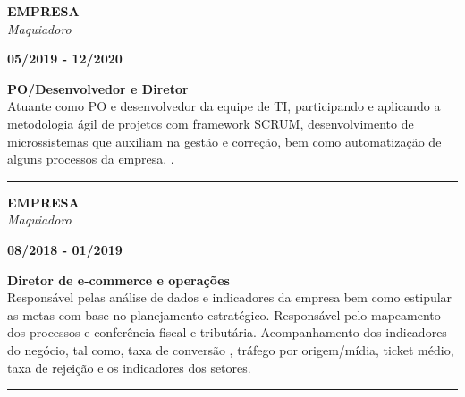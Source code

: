 \documentclass[12pt, a4paper]{article}
\newcommand{\LlinhaM}{1pt} 	 %
\newcommand{\TlinhaM}{17cm}		 %
\begin{document}
\begin{multicols}{2}
	\begin{flushleft}
		\textbf{EMPRESA}\\
		\textit{Maquiadoro}\\
	\end{flushleft}
	\vfill
	\begin{flushright}
		\textbf{05/2019 - 12/2020}\\
	\end{flushright}
\end{multicols}
\begin{flushleft}
	\textbf{PO/Desenvolvedor e Diretor}\\
	Atuante como PO e desenvolvedor da equipe de TI, participando e aplicando a metodologia ágil de projetos com framework SCRUM,
	desenvolvimento de microssistemas que auxiliam na gestão e correção, bem como automatização de alguns processos da empresa.
	.
\end{flushleft}

\begin{center} %
	\rule{\TlinhaM}{\LlinhaM}
\end{center}

\begin{multicols}{2}
	\begin{flushleft}
		\textbf{EMPRESA}\\
		\textit{Maquiadoro}\\
	\end{flushleft}
	\vfill
	\begin{flushright}
		\textbf{08/2018 - 01/2019}\\
	\end{flushright}
\end{multicols}
\begin{flushleft}
	\textbf{Diretor de e-commerce e operações}\\
	Responsável pelas análise de dados e indicadores da empresa bem como estipular as metas com base no planejamento estratégico.
	Responsável pelo mapeamento dos processos e conferência fiscal e tributária. Acompanhamento dos indicadores do negócio, tal como,
	taxa de conversão , tráfego por origem/mídia, ticket médio, taxa de rejeição e os indicadores dos setores.
\end{flushleft}

\begin{center} %
	\rule{\TlinhaM}{\LlinhaM}
\end{center}
\end{document}
